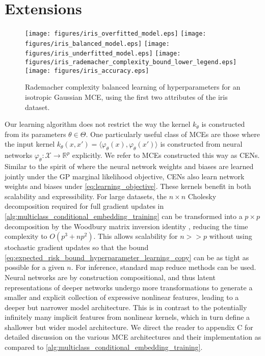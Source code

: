 \documentclass[twoside]{article}
\begin{document}
	\section{Extensions}
	
		\begin{figure*}[t]
			\centering
			\texttt{[image: figures/iris\_overfitted\_model.eps]}
			\texttt{[image: figures/iris\_balanced\_model.eps]}
			\texttt{[image: figures/iris\_underfitted\_model.eps]}
			\texttt{[image: figures/iris\_rademacher\_complexity\_bound\_lower\_legend.eps]}
			\texttt{[image: figures/iris\_accuracy.eps]}
			\caption{Rademacher complexity balanced learning of hyperparameters for an isotropic Gaussian \gls{MCE}, using the first two attributes of the iris dataset.}
			\label{fig:iris}
		\end{figure*}
		
		Our learning algorithm does not restrict the way the kernel $k_{\theta}$ is constructed from its parameters $\theta \in \Theta$. One particularly useful class of \glspl{MCE} are those where the input kernel $k_{\theta}(x, x') = \langle \varphi_{\theta}(x), \varphi_{\theta}(x') \rangle$ is constructed from neural networks $\varphi_{\theta} : \mathcal{X} \to \mathbb{R}^{p}$ explicitly. We refer to \glspl{MCE} constructed this way as \glspl{CEN}. Similar to the spirit of \cite{wilson2016stochastic} where the neural network weights and biases are learned jointly under the \gls{GP} marginal likelihood objective, \glspl{CEN} also learn network weights and biases under \eqref{eq:learning_objective}. These kernels benefit in both scalability and expressibility. For large datasets, the $n \times n$ Cholesky decomposition required for full gradient updates in \cref{alg:multiclass_conditional_embedding_training} can be transformed into a $p \times p$ decomposition by the Woodbury matrix inversion identity \citep{higham2002accuracy}, reducing the time complexity to $O(p^{3} + np^{2})$. This allows scalability for $n >> p$ without using stochastic gradient updates so that the bound \eqref{eq:expected_risk_bound_hyperparameter_learning_copy} can be as tight as possible for a given $n$. For inference, standard map reduce methods can be used. Neural networks are by construction compositional, and thus latent representations of deeper networks undergo more transformations to generate a smaller and explicit collection of expressive nonlinear features, leading to a deeper but narrower model architecture. This is in contrast to the potentially infinitely many implicit features from nonlinear kernels, which in turn define a shallower but wider model architecture. We direct the reader to appendix C for detailed discussion on the various \gls{MCE} architectures and their implementation as compared to \cref{alg:multiclass_conditional_embedding_training}. 
		
\end{document}
